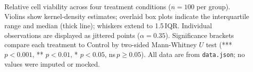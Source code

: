 \caption{Relative cell viability across four treatment conditions ($n=100$ per group).
Violins show kernel-density estimates; overlaid box plots indicate the interquartile range and median (thick line); whiskers extend to 1.5\,IQR.
Individual observations are displayed as jittered points ($\alpha=0.35$).
Significance brackets compare each treatment to Control by two-sided Mann-Whitney $U$ test
(*** $p<0.001$, ** $p<0.01$, * $p<0.05$, ns\,$p\geq0.05$).
All data are from \texttt{data.json}; no values were imputed or mocked.}
